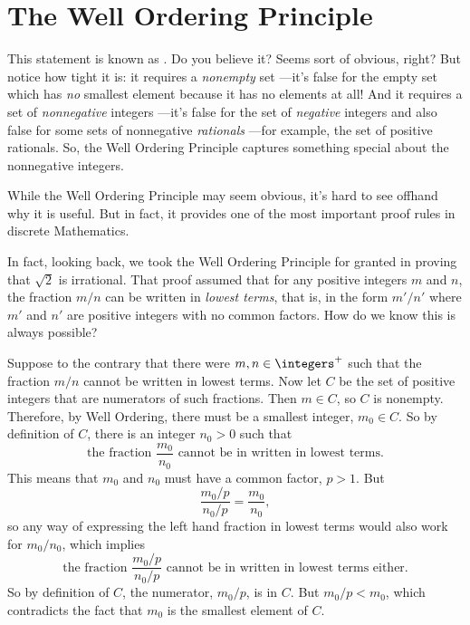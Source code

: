 \chapter{The Well Ordering Principle}


This statement is known as .  Do you
believe it?  Seems sort of obvious, right?  But notice how tight it is: it
requires a \emph{nonempty} set ---it's false for the empty set which has
\emph{no} smallest element because it has no elements at all!  And it
requires a set of \emph{nonnegative} integers ---it's false for the set of
\emph{negative} integers and also false for some sets of nonnegative
\emph{rationals} ---for example, the set of positive rationals.  So, the
Well Ordering Principle captures something special about the nonnegative
integers.


While the Well Ordering Principle may seem obvious, \iffalse it looks
nothing like the induction axiom, and\fi it's hard to see offhand why it
is useful.  But in fact, it provides one of the most important proof rules
in discrete Mathematics.  \iffalse We'll explain this after we introduce a
template for well ordering principle proofs resembling the template in
Section~\ref{templ-induct-proofs} for a proof by strong induction.\fi

In fact, looking back, we took the Well Ordering Principle for granted in
proving that $\sqrt{2}$ is irrational.  That proof assumed that for any
positive integers $m$ and $n$, the fraction $m/n$ can be written in
\textit{lowest terms}, that is, in the form $m'/n'$ where $m'$ and $n'$
are positive integers with no common factors.  How do we know this is
always possible?

Suppose to the contrary that there were $m,n \in \integers^+$ such that the
fraction $m/n$ cannot be written in lowest terms.  Now let $C$ be the set
of positive integers that are numerators of such fractions.  Then $m \in
C$, so $C$ is nonempty.  Therefore, by Well Ordering, there must be a
smallest integer, $m_0 \in C$.  So by definition of $C$, there is an
integer $n_0 > 0$ such that
\[
\text{the fraction } \frac{m_0}{n_0} \text{ cannot be in written in lowest
terms.}
\]
This means that $m_0$ and $n_0$ must have a common factor, $p>1$.  But
\[
\frac{m_0/p}{n_0/p} = \frac{m_0}{n_0},
\]
so any way of expressing the left hand fraction in lowest terms would also
work for $m_0/n_0$, which implies
\[
\text{the fraction } \frac{m_0/p}{n_0/p} \text{ cannot be in written in
lowest terms either.}
\]
So by definition of $C$, the numerator, $m_0/p$, is in $C$.  But $m_0/p <
m_0$, which contradicts the fact that $m_0$ is the smallest element of $C$.

